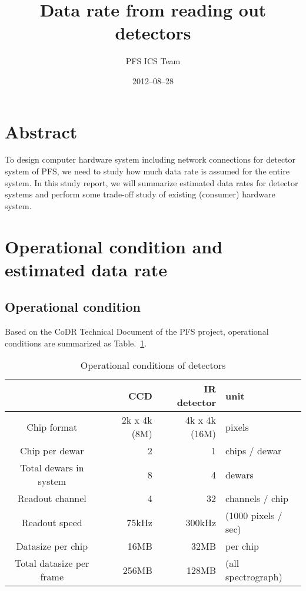 \documentclass[a4paper,notitlepage]{article}
\title{Data rate from reading out detectors}
\author{PFS ICS Team}
\date{2012--08--28}
\begin{document}

\ssnhead

\section{Abstract}

To design computer hardware system including network connections for detector 
system of PFS, we need to study how much data rate is assumed for the entire 
system. 
In this study report, we will summarize estimated data rates for detector 
systems and perform some trade-off study of existing (consumer) 
hardware system. 


\section{Operational condition and estimated data rate}

\subsection{Operational condition}

Based on the CoDR Technical Document of the PFS project, 
operational conditions are summarized as Table.~\ref{datarate-cond}.

\begin{table}[htb]
\caption{Operational conditions of detectors}
\label{datarate-cond}
\begin{center}
\begin{tabular}{c||r|r|l}
   & CCD & IR detector & unit \\
  \hline
  Chip format & 2k x 4k (8M) & 4k x 4k (16M) & pixels \\
  Chip per dewar & 2 & 1 & chips / dewar \\
  Total dewars in system & 8 & 4 & dewars \\
  Readout channel & 4 & 32 & channels / chip \\
  Readout speed & 75kHz & 300kHz & (1000 pixels / sec) \\
  \hline
  Datasize per chip & 16MB & 32MB & per chip \\
  Total datasize per frame & 256MB & 128MB & (all spectrograph) \\
\end{tabular}
\end{center}
\end{table}
\end{document}

